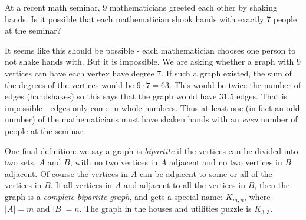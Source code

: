 \documentclass[12pt]{article}
\begin{document}
\begin{example}
  At a recent math seminar, 9 mathematicians greeted each other by shaking hands.  Is it possible that each mathematician shook hands with exactly 7 people at the seminar?
  \begin{solution}
    It seems like this should be possible - each mathematician chooses one person to not shake hands with.  But it is impossible.  We are asking whether a graph with 9 vertices can have each vertex have degree 7.  If such a graph existed, the sum of the degrees of the vertices would be $9\cdot 7 = 63$.  This would be twice the number of edges (handshakes) so this says that the graph would have $31.5$ edges.  That is impossible - edges only come in whole numbers.  Thus at least one (in fact an odd number) of the mathematicians must have shaken hands with an {\em even} number of people at the seminar.
  \end{solution}

\end{example}

One final definition: we say a graph is {\em bipartite} if the vertices can be divided into two sets, $A$ and $B$, with no two vertices in $A$ adjacent and no two vertices in $B$ adjacent.  Of course the vertices in $A$ can be adjacent to some or all of the vertices in $B$.  If all vertices in $A$ and adjacent to all the vertices in $B$, then the graph is a {\em complete bipartite graph}, and gets a special name: $K_{m,n}$, where $|A| = m$ and $|B| = n$.  The graph in the houses and utilities puzzle is $K_{3,3}$.
\end{document}
